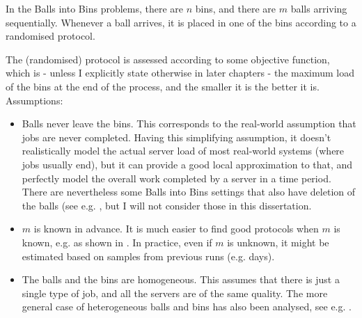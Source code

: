 In the Balls into Bins problems, there are $n$ bins, and there are $m$ balls arriving sequentially. Whenever a ball arrives, it is placed in one of the bins according to a randomised protocol. 


The (randomised) protocol is assessed according to some objective function, which is - unless I explicitly state otherwise in later chapters - the maximum load of the bins at the end of the process, and the smaller it is the better it is.\\


Assumptions:


\begin{itemize}
    \item
    Balls never leave the bins. This corresponds to the real-world assumption that jobs are never completed. Having this simplifying assumption, it doesn't realistically model the actual server load of most real-world systems (where jobs usually end), but it can provide a good local approximation  to that, and perfectly model the overall work completed by a server in a time period. There are nevertheless some Balls into Bins settings that also have deletion of the balls (see e.g. \cite{azar1999twochoice}, but I will not consider those in this dissertation.
    \item
    $m$ is known in advance. It is much easier to find good protocols when $m$ is known, e.g. as shown in \cite{feldheim2021longtermthinning}. In practice, even if $m$ is unknown, it might be estimated based on samples from previous runs (e.g. days).
    \item
    The balls and the bins are homogeneous. This assumes that there is just a single type of job, and all the servers are of the same quality. The more general case of heterogeneous balls and bins has also been analysed, see e.g. \cite{berenbrink2008weighted}.
\end{itemize}






